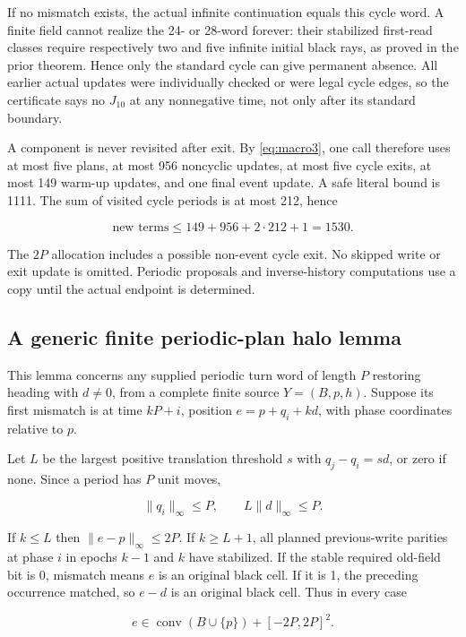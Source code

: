 If no mismatch exists, the actual infinite continuation equals this
cycle word. A finite field cannot realize the 24- or 28-word forever:
their stabilized first-read classes require respectively two and five
infinite initial black rays, as proved in the prior theorem. Hence only
the standard cycle can give permanent absence. All earlier actual
updates were individually checked or were legal cycle edges, so the
certificate says no $J_{10}$ at any nonnegative time, not only after its
standard boundary.

A component is never revisited after exit. By \eqref{eq:macro3}, one call
therefore uses at most five plans, at most 956 noncyclic updates, at
most five cycle exits, at most 149 warm-up updates, and one final event
update. A safe literal bound is 1111. The sum of visited cycle periods
is at most 212, hence

\[
\text{new terms}\le149+956+2\cdot212+1=1530.
\]

The $2P$ allocation includes a possible non-event cycle exit. No skipped
write or exit update is omitted. Periodic proposals and inverse-history
computations use a copy until the actual endpoint is determined.

\subsection{A generic finite periodic-plan halo lemma}\label{macro-6}

This lemma concerns any supplied periodic turn word of length $P$
restoring heading with $d\ne0$, from a complete finite source $Y=(B,p,h)$.
Suppose its first mismatch is at time $kP+i$, position $e=p+q_i+kd$, with
phase coordinates relative to $p$.

Let $L$ be the largest positive translation threshold $s$ with
$q_j-q_i=sd$, or zero if none. Since a period has $P$ unit moves,

\[
\|q_i\|_\infty\le P,\qquad L\|d\|_\infty\le P.
\]

If $k\le L$ then
$\|e-p\|_\infty\le2P$. If
$k\ge L+1$, all planned previous-write parities at phase $i$ in
epochs $k-1$ and $k$ have stabilized. If the stable required old-field bit
is 0, mismatch means $e$ is an original black cell. If it is 1, the
preceding occurrence matched, so $e-d$ is an original black cell. Thus in
every case

\begin{equation}\label{eq:macro5}
e\in\operatorname{conv}(B\cup\{p\})+[-2P,2P]^2.
\end{equation}


